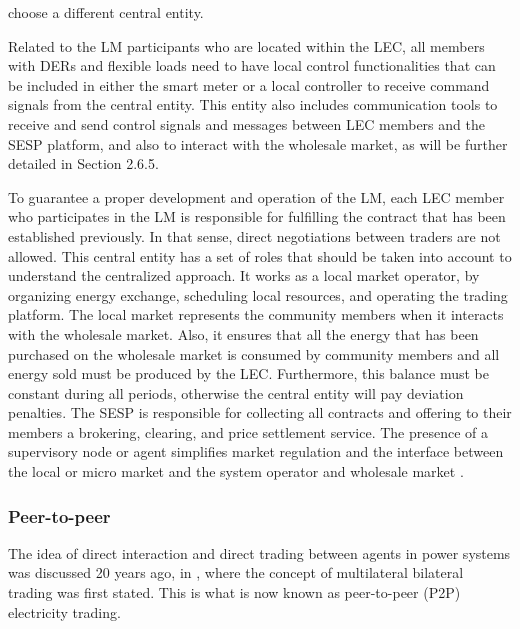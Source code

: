 choose a different central entity.

Related to the LM participants who are located within the LEC, all members with DERs and flexible loads need to have local control functionalities that can be included in either the smart meter or a local controller to receive command signals from the central entity. This entity also includes communication tools to receive and send control signals and messages between LEC members and the SESP platform, and also to interact with the wholesale market, as will be further detailed in Section 2.6.5.

To guarantee a proper development and operation of the LM, each LEC member who participates in the LM is responsible for fulfilling the contract that has been established previously. In that sense, direct negotiations between traders are not allowed. This central entity has a set of roles that should be taken into account to understand the centralized approach. It works as a local market operator, by organizing energy exchange, scheduling local resources, and operating the trading platform. The local market represents the community members when it interacts with the wholesale market. Also, it ensures that all the energy that has been purchased on the wholesale market is consumed by community members and all energy sold must be produced by the LEC. Furthermore, this balance must be constant during all periods, otherwise the central entity will pay deviation penalties. The SESP is responsible for collecting all contracts and offering to their members a brokering, clearing, and price settlement service. The presence of a supervisory node or agent simplifies market regulation and the interface between the local or micro market and the system operator and wholesale market \cite{moret2018energy}.

\subsubsection{Peer-to-peer}
The idea of direct interaction and direct trading between agents in power systems was discussed 20 years ago, in \cite{wu1999coordinated}, where the concept of multilateral bilateral trading was first stated. This is what is now known as peer-to-peer (P2P) electricity trading.

